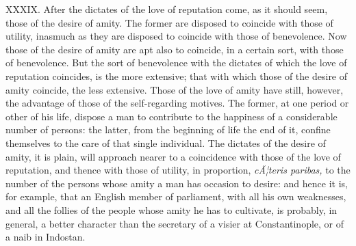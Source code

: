 \documentclass[12pt]{report}
\begin{document}
XXXIX. After the dictates of the love of reputation come, as it should
seem, those of the desire of amity. The former are disposed to coincide
with those of utility, inasmuch as they are disposed to coincide with
those of benevolence. Now those of the desire of amity are apt also to
coincide, in a certain sort, with those of benevolence. But the sort of
benevolence with the dictates of which the love of reputation coincides,
is the more extensive; that with which those of the desire of amity
coincide, the less extensive. Those of the love of amity have still,
however, the advantage of those of the self-regarding motives. The
former, at one period or other of his life, dispose a man to contribute
to the happiness of a considerable number of persons: the latter, from
the beginning of life the end of it, confine themselves to the care of
that single individual. The dictates of the desire of amity, it is
plain, will approach nearer to a coincidence with those of the love of
reputation, and thence with those of utility, in proportion,
\emph{cÃ¦teris paribas,} to the number of the persons whose amity a man
has occasion to desire: and hence it is, for example, that an English
member of parliament, with all his own weaknesses, and all the follies
of the people whose amity he has to cultivate, is probably, in general,
a better character than the secretary of a visier at Constantinople, or
of a naib in Indostan.
\end{document}
